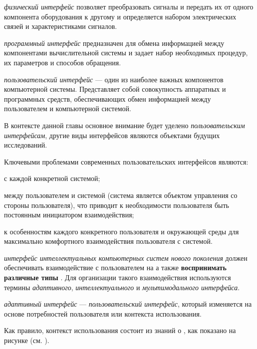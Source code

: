 \textit{физический интерфейс} позволяет преобразовать сигналы и передать их от одного компонента оборудования к другому и определяется набором электрических связей и характеристиками сигналов.

\textit{программный интерфейс} предназначен для обмена информацией между компонентами вычислительной системы и задает набор необходимых процедур, их параметров и способов обращения.

\textit{пользовательский интерфейс} --- один из наиболее важных компонентов компьютерной системы. Представляет собой совокупность аппаратных и программных средств, обеспечивающих обмен информацией между пользователем и компьютерной системой.

В контексте данной главы основное внимание будет уделено \textit{пользовательским интерфейсам}, другие виды интерфейсов являются объектами будущих исследований.

Ключевыми проблемами современных пользовательских интерфейсов являются:
\begin{textitemize}
	\item {} с каждой конкретной системой;
	\item {} между пользователем и системой (система является объектом управления со стороны пользователя), что приводит к необходимости пользователя быть постоянным инициатором взаимодействия;
	\item {} к особенностям каждого конкретного пользователя и окружающей среды для максимально комфортного взаимодействия пользователя с системой.
\end{textitemize}

\textit{интерфейс интеллектуальных компьютерных систем нового поколения} должен обеспечивать взаимодействие с пользователем на  а также \textbf{воспринимать различные типы} . Для организации такого взаимодействия используются термины \textit{адаптивного}, \textit{интеллектуального} и \textit{мультимодального интерфейса}.

\textit{адаптивный интерфейс} --- \textit{пользовательский интерфейс}, который изменяется на основе потребностей пользователя или контекста использования.

Как правило, контекст использования состоит из знаний о , как показано на рисунке \textit{} (см. ).

